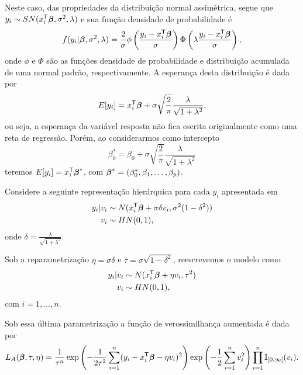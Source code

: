 Neste caso, das propriedades da distribuição normal assimétrica, segue que $y_i\sim SN(x_i^{\mathsf{T}}{\boldsymbol{\beta}},\sigma^2,\lambda)$ e sua função densidade de probabilidade é
\begin{equation}\label{eq:fdp_skewN}
f(y_i|{\boldsymbol{\beta}},\sigma^2,\lambda) = \frac{2}{\sigma}\phi\left(\frac{y_i-x_i^{\mathsf{T}}{\boldsymbol{\beta}}}{\sigma}\right)\Phi\left(\lambda \frac{y_i-x_i^{\mathsf{T}}{\boldsymbol{\beta}}}{\sigma}\right),
\end{equation}
onde $\phi$ e $\Phi$ são as funções densidade de probabilidade e distribuição acumulada de uma normal padrão, respectivamente. A esperança desta distribuição é dada por
\begin{equation}
E[y_i] = x_i^{\mathsf{T}}{\boldsymbol{\beta}} + \sigma \sqrt{\frac{2}{\pi}}\frac{\lambda}{\sqrt{1+\lambda^2}},
\end{equation}
ou seja, a esperança da variável resposta não fica escrita originalmente como uma reta de regressão. Porém, ao considerarmos como intercepto
\begin{equation}
\beta_0^* = \beta_0 + \sigma \sqrt{\frac{2}{\pi}}\frac{\lambda}{\sqrt{1+\lambda^2}}
\end{equation}
teremos $E[y_i]=x_i^{\mathsf{T}}{\boldsymbol{\beta}}^*$, com ${\boldsymbol{\beta}}^*=(\beta_0^*,\beta_1,\ldots,\beta_p)$.

Considere a seguinte representação hierárquica para cada $y_i$ apresentada em \citet{Bayes2005:MSc}
\begin{equation}
\begin{split}
y_i|v_i & \sim  N(x_i^{\mathsf{T}}{\boldsymbol{\beta}}+\sigma\delta v_i,\sigma^2(1-\delta^2)) \\
v_i & \sim  HN(0,1),
\end{split}
\end{equation}
onde $\delta=\frac{\lambda}{\sqrt{1+\lambda^2}}$.

Sob a reparametrização $\eta=\sigma\delta$ e $\tau=\sigma\sqrt{1-\delta^2}$, reescrevemos o modelo como
\begin{equation}
\begin{split}
y_i|v_i & \sim N(x_i^{\mathsf{T}}{\boldsymbol{\beta}}+\eta v_i,\tau^2) \\
v_i & \sim  HN(0,1),
\end{split}
\end{equation}
com $i=1,\ldots,n$.

Sob essa última parametrização a função de verossimilhança aumentada é dada por
\begin{equation}\label{eq:aug_ll_skewn}
L_A({\boldsymbol{\beta}},\tau,\eta) = \frac{1}{\tau^n} \exp\left(-\frac{1}{2{\tau^2}}\sum_{i=1}^n(y_i-x_i^{\mathsf{T}}{\boldsymbol{\beta}} - \eta v_i)^2\right)\exp\left(-\frac{1}{2}\sum_{i=1}^nv_i^2\right)\prod_{i=1}^n \mathbb{I}_{[0,\infty[}(v_i).
\end{equation}

